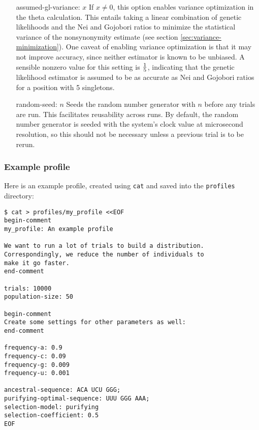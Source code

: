 \documentclass{article}
\begin{document}
        \begin{enumerate}
          \item[assumed-gl-variance: $x$]
	  If $x \neq 0$, this option enables variance optimization in the theta
	  calculation. This entails taking a linear combination of genetic
	  likelihoods and the Nei and Gojobori ratios to minimize the
	  statistical variance of the nonsynonymity estimate (see section
	      \ref{sec:variance-minimization}). One caveat of enabling variance
	  optimization is that it may not improve accuracy, since neither
	  estimator is known to be unbiased. A sensible nonzero value for this
	  setting is $1 \over 5$, indicating that the genetic likelihood
	  estimator is assumed to be as accurate as Nei and Gojobori ratios for
	  a position with 5 singletons.

          \item[random-seed: $n$]
          Seeds the random number generator with $n$ before any trials are run.
          This facilitates reusability across runs. By default, the random
          number generator is seeded with the system's clock value at
          microsecond resolution, so this should not be necessary unless a
          previous trial is to be rerun.
        \end{enumerate}

      \subsubsection{Example profile}
        \label{sec:example-profile}

        Here is an example profile, created using \verb|cat| and saved into the
        \verb|profiles| directory:

        \begin{verbatim}
$ cat > profiles/my_profile <<EOF
begin-comment
my_profile: An example profile

We want to run a lot of trials to build a distribution.
Correspondingly, we reduce the number of individuals to
make it go faster.
end-comment

trials: 10000
population-size: 50

begin-comment
Create some settings for other parameters as well:
end-comment

frequency-a: 0.9
frequency-c: 0.09
frequency-g: 0.009
frequency-u: 0.001

ancestral-sequence: ACA UCU GGG;
purifying-optimal-sequence: UUU GGG AAA;
selection-model: purifying
selection-coefficient: 0.5
EOF
        \end{verbatim}
\end{document}
